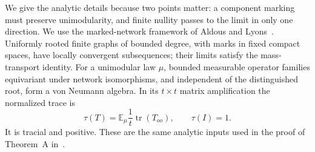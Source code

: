 We give the analytic details because two points matter: a component
marking must preserve unimodularity, and finite nullity passes to the
limit in only one direction.
We use the marked-network framework of Aldous and Lyons~\cite[Sections~2
and~5]{AldousLyons}.  Uniformly rooted finite graphs of bounded degree,
with marks in fixed compact spaces, have locally convergent subsequences;
their limits satisfy the mass-transport identity.  For a unimodular law
$\mu$, bounded measurable operator families equivariant under network
isomorphisms, and independent of the distinguished root, form a von Neumann
algebra.  In its $t\times t$ matrix amplification the normalized trace is
\begin{equation}
 \tau(T)=\mathbb E_\mu\frac1t\operatorname{tr}(T_{oo}),
 \qquad \tau(I)=1.
 \label{eq:dc-trace}
\end{equation}
It is tracial and positive.  These are the same analytic inputs used in
the proof of Theorem~A in~\cite{BrendeCurved}.

